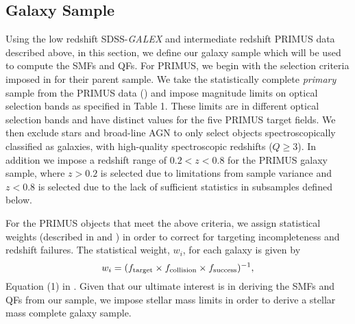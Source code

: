 \documentclass{emulateapj}
\begin{document}
\subsection{Galaxy Sample} \label{sec:target} 
Using the low redshift SDSS-{\em GALEX} and intermediate redshift PRIMUS data described above, in this section, we define our galaxy sample which will be used to compute the SMFs and QFs. For PRIMUS, we begin with the selection criteria imposed in \cite{Moustakas:2013aa} for their parent sample. We take the statistically complete {\em primary} sample from the PRIMUS data (\cite{Coil:2011aa}) and impose magnitude limits on optical selection bands as specified in \cite{Moustakas:2013aa} Table 1. These limits are in different optical selection bands and have distinct values for the five PRIMUS target fields. We then exclude stars and broad-line AGN to only select objects spectroscopically classified as galaxies, with high-quality spectroscopic redshifts ($Q \geq 3$). In addition we impose a redshift range of $ 0.2 < z < 0.8$ for the PRIMUS galaxy sample, where $ z > 0.2$ is selected due to limitations from sample variance and $ z < 0.8$ is selected due to the lack of sufficient statistics in subsamples defined below. 

For the PRIMUS objects that meet the above criteria, we assign statistical weights (described in \cite{Coil:2011aa} and \cite{Cool:2013aa}) in order to correct for targeting incompleteness and redshift failures. The statistical weight, $w_i$, for each galaxy is given by
\begin{equation}
w_{i} = (f_{\rm{target}} \times f_{\rm{collision}} \times f_{\rm{success}})^{-1},
\end{equation}
Equation (1) in \cite{Moustakas:2013aa}. Given that our ultimate interest is in deriving the SMFs and QFs from our sample, we impose stellar mass limits in order to derive a stellar mass complete galaxy sample. 
\end{document}
